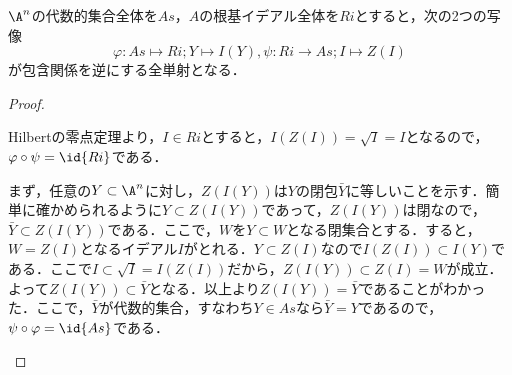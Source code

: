 \begin{prop}
	$\A^n$の代数的集合全体を$As，A$の根基イデアル全体を$Ri$とすると，次の2つの写像
	\[\varphi:As\longmapsto Ri;Y\longmapsto I(Y), \psi:Ri\longrightarrow As; I \longmapsto Z( I )\]
	が包含関係を逆にする全単射となる．
\end{prop}
\begin{proof}
	\begin{step}
		\item Hilbertの零点定理より，$ I \in Ri$とすると，$I(Z( I ))=\sqrt{ I }= I $となるので，$\varphi\circ\psi=\id{Ri}$である．
		\item まず，任意の$Y\subset \A^n$に対し，$Z(I(Y))$は$Y$の閉包$\bar{Y}$に等しいことを示す．簡単に確かめられるように$Y\subset Z(I(Y))$であって，$Z(I(Y))$は閉なので，$\bar{Y}\subset Z(I(Y))$である．ここで，$W$を$Y\subset W$となる閉集合とする．すると，$W=Z( I )$となるイデアル$ I $がとれる．$Y\subset Z( I )$なので$I(Z( I ))\subset I(Y)$である．ここで$ I \subset \sqrt{ I }=I(Z( I ))$だから，$Z(I(Y))\subset Z( I )=W$が成立．よって$Z(I(Y))\subset \bar{Y}$となる．以上より$Z(I(Y))=\bar{Y}$であることがわかった．ここで，$\bar{Y}$が代数的集合，すなわち$Y\in As$なら$\bar{Y}=Y$であるので，$\psi\circ\varphi=\id{As}$である．
	\end{step}
\end{proof}
